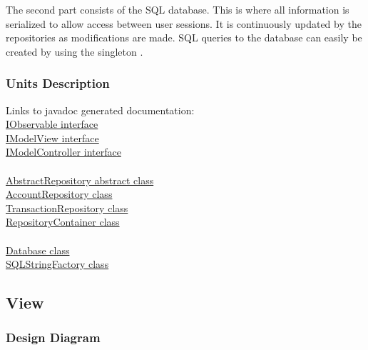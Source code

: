 \documentclass[12pt]{article}
\begin{document}
The second part consists of the SQL database. This is where all information is serialized to allow access between user sessions. It is continuously updated by the repositories as modifications are made. SQL queries to the database can easily be created by using the singleton .\\

\subsubsection{Units Description}

Links to javadoc generated documentation:\\
\href{run:javadoc/IObservable.html}{IObservable interface}\\
\href{run:javadoc/IModelView.html}{IModelView interface}\\
\href{run:javadoc/IModelController.html}{IModelController interface}\\
\\
\href{run:javadoc/AbstractRepository.html}{AbstractRepository abstract class}\\
\href{run:javadoc/AccountRepository.html}{AccountRepository class}\\
\href{run:javadoc/TransactionRepository.html}{TransactionRepository class}\\
\href{run:javadoc/RepositoryContainer.html}{RepositoryContainer class}\\
\\
\href{run:javadoc/Database.html}{Database class}\\
\href{run:javadoc/SQLStringFactory.html}{SQLStringFactory class}\\

\subsection{View}

\subsubsection{Design Diagram}
\end{document}
